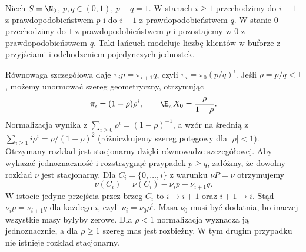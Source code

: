 \begin{przyklad}
Niech $S=\N_0$, $p,q\in(0,1)$, $p+q=1$.
W stanach $i\geq1$ przechodzimy do $i+1$
z prawdopodobieństwem $p$ i do $i-1$
z prawdopodobieństwem $q$.
W stanie $0$ przechodzimy do $1$ z
prawdopodobieństwem $p$ i pozostajemy w $0$
z prawdopodobieństwem $q$. Taki łańcuch
modeluje liczbę klientów w buforze z przyjściami
i odchodzeniem pojedynczych jednostek.

Równowaga szczegółowa daje
$\pi_i p=\pi_{i+1}q$, czyli
$\pi_i=\pi_0(p/q)^i$. Jeśli $\rho=p/q<1$,
możemy unormować szereg geometryczny,
otrzymując
\[
\pi_i=(1-\rho)\rho^i,
\qquad \E_\pi X_0=\frac{\rho}{1-\rho}.
\]
Normalizacja wynika z $\sum_{i\geq0}\rho^i=(1-\rho)^{-1}$,
a wzór na średnią z
$\sum_{i\geq1}i\rho^i=\rho/(1-\rho)^2$
(różniczkujemy szereg potęgowy dla $|\rho|<1$).
Otrzymany rozkład jest stacjonarny dzięki
równowadze szczegółowej.
Aby wykazać jednoznaczność i rozstrzygnąć
przypadek $p\geq q$, załóżmy, że dowolny rozkład
$\nu$ jest stacjonarny. Dla $C_i=\{0,\ldots,i\}$
z warunku $\nu P=\nu$ otrzymujemy
\[
\nu(C_i)=\nu(C_i)-\nu_i p+\nu_{i+1}q.
\]
W istocie jedyne przejścia przez brzeg $C_i$
to $i\to i+1$ oraz $i+1\to i$.
Stąd $\nu_i p=\nu_{i+1}q$ dla każdego $i$,
czyli $\nu_i=\nu_0\rho^i$. Masa $\nu_0$ musi
być dodatnia, bo inaczej wszystkie masy
byłyby zerowe. Dla $\rho<1$ normalizacja
wyznacza ją jednoznacznie, a dla $\rho\geq1$
szereg mas jest rozbieżny. W tym drugim
przypadku nie istnieje rozkład stacjonarny.


\end{przyklad}
